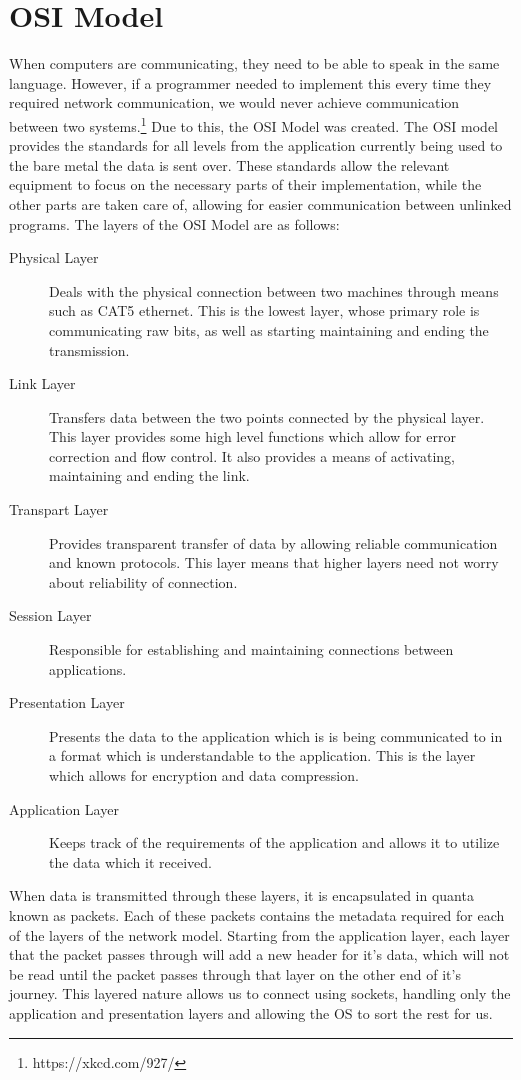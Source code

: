 \documentclass[a4paper,11pt]{report}
\begin{document}
	\section{OSI Model}
		When computers are communicating, they need to be able to speak in the same language.\cite{HackingAOE} 
		However, if a programmer needed to implement this every time they required network communication, we would never achieve communication between two systems.\footnote{https://xkcd.com/927/} 
		Due to this, the OSI Model was created. 
		The OSI model provides the standards for all levels from the application currently being used to the bare metal the data is sent over. 
		These standards allow the relevant equipment to focus on the necessary parts of their implementation, while the other parts are taken care of, allowing for easier communication between unlinked programs. 
		The layers of the OSI Model are as follows:
		\begin{description}
			\item[Physical Layer]
				Deals with the physical connection between two machines through means such as CAT5 ethernet. 
				This is the lowest layer, whose primary role is communicating raw bits, as well as starting maintaining and ending the transmission. 
			\item[Link Layer]
				Transfers data between the two points connected by the physical layer. 
				This layer provides some high level functions which allow for error correction and flow control. 
				It also provides a means of activating, maintaining and ending the link. 
			\item[Transpart Layer]
				Provides transparent transfer of data by allowing reliable communication and known protocols. 
				This layer means that higher layers need not worry about reliability of connection. 
			\item[Session Layer]
				Responsible for establishing and maintaining connections between applications. 
			\item[Presentation Layer]
				Presents the data to the application which is is being communicated to in a format which is understandable to the application. 
				This is the layer which allows for encryption and data compression. 
			\item[Application Layer] 
				Keeps track of the requirements of the application and allows it to utilize the data which it received. 
		\end{description}
		When data is transmitted through these layers, it is encapsulated in quanta known as packets. 
		Each of these packets contains the metadata required for each of the layers of the network model. 
		Starting from the application layer, each layer that the packet passes through will add a new header for it's data, which will not be read until the packet passes through that layer on the other end of it's journey. 
		This layered nature allows us to connect using sockets, handling only the application and presentation layers and allowing the OS to sort the rest for us. 
\end{document}
